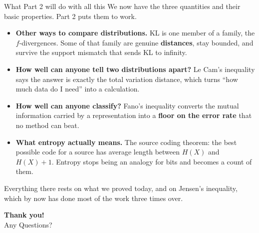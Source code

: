 \documentclass[aspectratio=169,9pt]{beamer}
\newcommand{\orange}[1]{\textcolor{AmazonOrange}{\textbf{#1}}}
\newcommand{\blue}[1]{\textcolor{densityblue}{\textbf{#1}}}
\newcommand{\muted}[1]{\textcolor{EPICMuted}{#1}}
\begin{document}
\begin{frame}{What Part 2 will do with all this}
We now have the three quantities and their basic properties. Part 2 puts them to work.
\vspace{0.2cm}
\pause
\begin{itemize}
    \item \orange{Other ways to compare distributions.} KL is one member of a family, the $f$-divergences.
    Some of that family are genuine \blue{distances}, stay bounded, and survive the support mismatch that
    sends KL to infinity.
    \pause
    \item \orange{How well can anyone tell two distributions apart?} Le Cam's inequality says the answer is
    exactly the total variation distance, which turns ``how much data do I need'' into a calculation.
    \pause
    \item \orange{How well can anyone classify?} Fano's inequality converts the mutual information carried by
    a representation into a \blue{floor on the error rate} that no method can beat.
    \pause
    \item \orange{What entropy actually means.} The source coding theorem: the best possible code for a source
    has average length between $H(X)$ and $H(X) + 1$. Entropy stops being an analogy for bits and becomes a
    count of them.
\end{itemize}
\vspace{0.25cm}
\pause
\muted{Everything there rests on what we proved today, and on Jensen's inequality, which by now has done most
of the work three times over.}
\end{frame}


% 
% 

\begin{frame}[plain]
\begin{center}
\vspace{2cm}
{\Huge\orange{Thank you!}}\\[0.4cm]
{\Large Any Questions?}
\end{center}
\end{frame}
\end{document}
